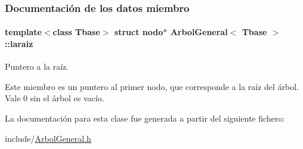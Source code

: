 \subsubsection{Documentación de los datos miembro}
\hypertarget{classArbolGeneral_a14a859dc79b8df4d5a77b5c871713c9e}{
\paragraph[{laraiz}]{\setlength{\rightskip}{0pt plus 5cm}template$<$class Tbase$>$ struct {\bf nodo}$\ast$ {\bf Arbol\-General}$<$ Tbase $>$\-::laraiz\hspace{0.3cm}{\ttfamily [private]}}}\label{classArbolGeneral_a14a859dc79b8df4d5a77b5c871713c9e}


Puntero a la raíz. 

Este miembro es un puntero al primer nodo, que corresponde a la raíz del árbol. Vale 0 sin el árbol es vacío. 

La documentación para esta clase fue generada a partir del siguiente fichero\-:\begin{DoxyCompactItemize}
\item 
include/\hyperlink{ArbolGeneral_8h}{Arbol\-General.\-h}\end{DoxyCompactItemize}
